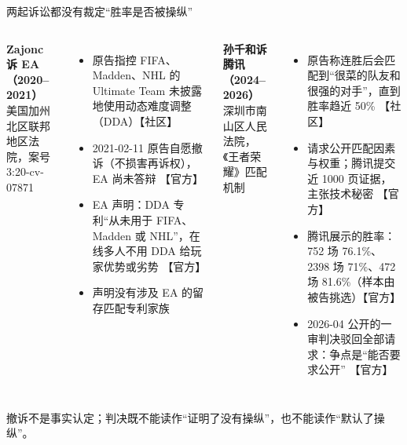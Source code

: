 \documentclass[aspectratio=169,11pt]{beamer}
\newcommand{\evtag}[2]{\mbox{\textcolor{#1}{\scriptsize【#2】}}}
\newcommand{\tagOff}{\evtag{cAqua}{官方}}
\newcommand{\tagCom}{\evtag{cOrange}{社区}}
\newcommand{\tightlist}{\setlength{\itemsep}{2pt}\setlength{\parskip}{0pt}}
\begin{document}
\begin{frame}{两起诉讼都没有裁定“胜率是否被操纵”}
\begin{columns}[T,onlytextwidth]
\begin{notebox}[cBlue]
\small\textbf{Zajonc 诉 EA（2020–2021）}\\[-1pt]
{\scriptsize\color{inkMuted}美国加州北区联邦地区法院，案号 3:20-cv-07871}
\end{notebox}
\footnotesize
\begin{itemize}\tightlist
  \item 原告指控 FIFA、Madden、NHL 的 Ultimate Team 未披露地使用动态难度调整（DDA）\tagCom
  \item 2021-02-11 原告自愿撤诉（不损害再诉权），EA 尚未答辩 \tagOff
  \item EA 声明：DDA 专利“从未用于 FIFA、Madden 或 NHL”，在线多人不用 DDA 给玩家优势或劣势 \tagOff
  \item 声明没有涉及 EA 的留存匹配专利家族
\end{itemize}
\begin{notebox}[cOrange]
\small\textbf{孙千和诉腾讯（2024–2026）}\\[-1pt]
{\scriptsize\color{inkMuted}深圳市南山区人民法院，《王者荣耀》匹配机制}
\end{notebox}
\footnotesize
\begin{itemize}\tightlist
  \item 原告称连胜后会匹配到“很菜的队友和很强的对手”，直到胜率趋近 50\% \tagCom
  \item 请求公开匹配因素与权重；腾讯提交近 1000 页证据，主张技术秘密 \tagOff
  \item 腾讯展示的胜率：752 场 76.1\%、2398 场 71\%、472 场 81.6\%（样本由被告挑选）\tagOff
  \item 2026-04 公开的一审判决驳回全部请求：争点是“能否要求公开” \tagOff
\end{itemize}
\end{columns}
\medskip
\begin{notebox}[inkFaint]
\footnotesize 撤诉不是事实认定；判决既不能读作“证明了没有操纵”，也不能读作“默认了操纵”。
\end{notebox}
\end{frame}
\end{document}
